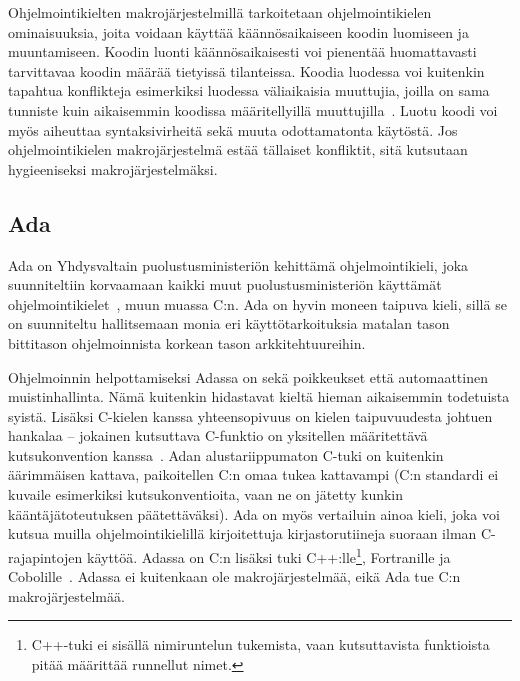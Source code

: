 Ohjelmointikielten makrojärjestelmillä tarkoitetaan ohjelmointikielen
ominaisuuksia, joita voidaan käyttää käännösaikaiseen koodin luomiseen ja
muuntamiseen. Koodin luonti käännösaikaisesti voi pienentää huomattavasti
tarvittavaa koodin määrää tietyissä tilanteissa. Koodia luodessa voi kuitenkin 
tapahtua konflikteja esimerkiksi luodessa väliaikaisia muuttujia, joilla on
sama tunniste kuin aikaisemmin koodissa määritellyillä
muuttujilla~\citep{macrohygiene}. Luotu koodi voi myös aiheuttaa
syntaksivirheitä sekä muuta odottamatonta käytöstä. Jos ohjelmointikielen
makrojärjestelmä estää tällaiset konfliktit, sitä kutsutaan hygieeniseksi
makrojärjestelmäksi.

%

%

\subsection{Ada}

Ada on Yhdysvaltain puolustusministeriön kehittämä ohjelmointikieli, joka
suunniteltiin korvaamaan kaikki muut puolustusministeriön käyttämät
ohjelmointikielet~\citep{adahistory}, muun muassa C:n. Ada on hyvin moneen
taipuva kieli, sillä se on suunniteltu hallitsemaan monia eri
käyttötarkoituksia matalan tason bittitason ohjelmoinnista korkean tason
arkkitehtuureihin.

Ohjelmoinnin helpottamiseksi Adassa on sekä poikkeukset että automaattinen
muistinhallinta. Nämä kuitenkin hidastavat kieltä hieman aikaisemmin todetuista
syistä. Lisäksi C-kielen kanssa yhteensopivuus on kielen taipuvuudesta johtuen
hankalaa -- jokainen kutsuttava C-funktio on yksitellen määritettävä
kutsukonvention kanssa~\citep[s.~471]{ADA12}. Adan
alustariippumaton C-tuki on kuitenkin äärimmäisen kattava, paikoitellen C:n
omaa tukea kattavampi (C:n standardi ei kuvaile esimerkiksi kutsukonventioita,
vaan ne on jätetty kunkin kääntäjätoteutuksen päätettäväksi). Ada on myös
vertailuin ainoa kieli, joka voi kutsua muilla ohjelmointikielillä
kirjoitettuja kirjastorutiineja suoraan ilman C-rajapintojen käyttöä. Adassa on
C:n lisäksi tuki C++:lle\footnote{C++-tuki ei sisällä nimiruntelun tukemista,
vaan kutsuttavista funktioista pitää määrittää runnellut nimet.}, Fortranille
ja Cobolille~\citep[s.~585]{ADA12}. Adassa ei kuitenkaan ole makrojärjestelmää,
eikä Ada tue C:n makrojärjestelmää.

